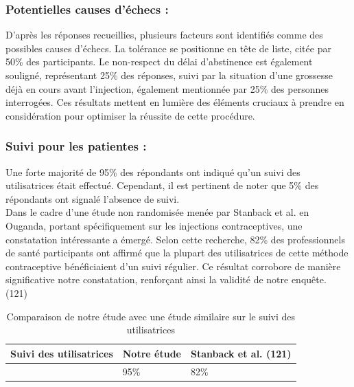 \subsubsection{Potentielles causes d’échecs : }

D'après les réponses recueillies, plusieurs facteurs sont identifiés comme des possibles causes d'échecs. La tolérance se positionne en tête de liste, citée par 50\% des participants. Le non-respect du délai d'abstinence est également souligné, représentant 25\% des réponses, suivi par la situation d'une grossesse déjà en cours avant l'injection, également mentionnée par 25\% des personnes interrogées. Ces résultats mettent en lumière des éléments cruciaux à prendre en considération pour optimiser la réussite de cette procédure.

\subsubsection{Suivi pour les patientes : }

Une forte majorité de 95\% des répondants ont indiqué qu'un suivi des utilisatrices était effectué. Cependant, il est pertinent de noter que 5\% des répondants ont signalé l'absence de suivi.\\

\noindent Dans le cadre d'une étude non randomisée menée par Stanback et al. en Ouganda, portant spécifiquement sur les injections contraceptives, une constatation intéressante a émergé. Selon cette recherche, 82\% des professionnels de santé participants ont affirmé que la plupart des utilisatrices de cette méthode contraceptive bénéficiaient d'un suivi régulier. Ce résultat corrobore de manière significative notre constatation, renforçant ainsi la validité de notre enquête. (121)

\begin{table}[H]
  \centering
  \renewcommand{\arraystretch}{1.5}

  \begin{spacing}{1.5} %
  \begin{tabularx}{\textwidth}{|p{6cm}|X|X|}
      \hline
      \textbf{Suivi des utilisatrices} & \textbf{Notre étude } & \textbf{Stanback et al. (121)} \\
      \hline
     & 95\% & 82\% \\
      
      
      \hline
  \end{tabularx}
\end{spacing}
\captionsetup{justification=centering} %
\caption{Comparaison de notre étude avec une étude similaire sur le suivi des utilisatrices}

\end{table}


